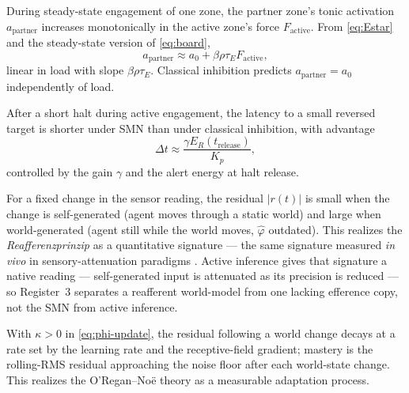 \documentclass{article}
\begin{document}
\begin{description}[itemsep=4pt,labelindent=0pt,leftmargin=2em,
                    style=nextline]
\item[Register 1 (tonic load coupling):]
During steady-state engagement of one zone, the partner zone's tonic
activation $a_{\text{partner}}$ increases monotonically in the active
zone's force $F_{\text{active}}$.  From \eqref{eq:Estar} and the
steady-state version of \eqref{eq:board},
\begin{equation}
a_{\text{partner}} \approx a_0 + \beta\rho\tau_E F_{\text{active}},
\label{eq:sig1}
\end{equation}
linear in load with slope $\beta\rho\tau_E$.  Classical inhibition
predicts $a_{\text{partner}}=a_0$ independently of load.

\item[Register 2 (resumption latency):]
After a short halt during active engagement, the latency to a small
reversed target is shorter under SMN than under classical inhibition, with
advantage
\begin{equation}
\Delta t \approx \frac{\gamma E_R(t_{\text{release}})}{K_p},
\label{eq:sig2}
\end{equation}
controlled by the gain $\gamma$ and the alert energy at halt release.

\item[Register 3 (reafference --- self versus world):]
For a fixed change in the sensor reading, the residual $|r(t)|$ is small
when the change is self-generated (agent moves through a static world) and
large when world-generated (agent still while the world moves,
$\hat\varphi$ outdated).  This realizes the \emph{Reafferenzprinzip}
\citep{vonHolstMittelstaedt1950,CrapseSommer2008} as a quantitative
signature --- the same signature measured \emph{in vivo} in
sensory-attenuation paradigms \citep{BlakemoreWolpertFrith1998Tickle}.
Active inference gives that signature a native reading --- self-generated
input is attenuated as its precision is reduced
\citep{Brown2013SensoryAttenuation} --- so Register~3 separates a
reafferent world-model from one lacking efference copy, not the SMN from
active inference.

\item[Register 4 (sensorimotor contingency mastery):]
With $\kappa>0$ in \eqref{eq:phi-update}, the residual following a world
change decays at a rate set by the learning rate and the receptive-field
gradient; mastery is the rolling-RMS residual approaching the noise floor
after each world-state change.  This realizes the O'Regan--No\"e theory
\citep{OReganNoe2001Sensorimotor} as a measurable adaptation process.


\end{description}
\end{document}
